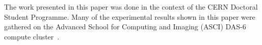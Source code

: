 \begin{acks}
The work presented in this paper was done in the context of the CERN Doctoral Student Programme. Many of the experimental results shown in this paper were gathered on the Advanced School for Computing and Imaging (ASCI) DAS-6 compute cluster~\cite{7469992}.
\end{acks}